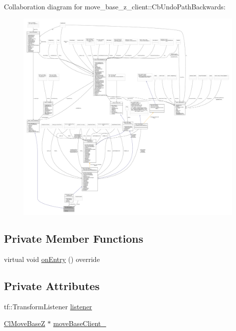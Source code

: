Collaboration diagram for move\+\_\+base\+\_\+z\+\_\+client\+:\+:Cb\+Undo\+Path\+Backwards\+:\nopagebreak
\begin{figure}[H]
\begin{center}
\leavevmode
\includegraphics[width=350pt]{classmove__base__z__client_1_1CbUndoPathBackwards__coll__graph}
\end{center}
\end{figure}
\subsection*{Private Member Functions}
\begin{DoxyCompactItemize}
\item 
virtual void \hyperlink{classmove__base__z__client_1_1CbUndoPathBackwards_a2793c69857aa97337d56ff79dee20508}{on\+Entry} () override
\end{DoxyCompactItemize}
\subsection*{Private Attributes}
\begin{DoxyCompactItemize}
\item 
tf\+::\+Transform\+Listener \hyperlink{classmove__base__z__client_1_1CbUndoPathBackwards_a197e2034e873c09de896e7a8b6fe898f}{listener}
\item 
\hyperlink{classmove__base__z__client_1_1ClMoveBaseZ}{Cl\+Move\+BaseZ} $\ast$ \hyperlink{classmove__base__z__client_1_1CbUndoPathBackwards_a19e7ace85698725a1d2730a7c6b3aa7d}{move\+Base\+Client\+\_\+}
\end{DoxyCompactItemize}
